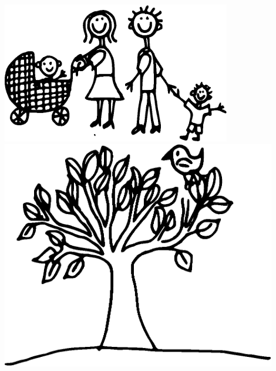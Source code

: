 \documentclass[11pt,a4paper,twoside]{article}
\begin{document}
\pagebreak
\includegraphics[width=10cm]{1.eps}
\vfil
\pagebreak
\vfil
\pagebreak
\vfil
\pagebreak
\vfil
\vfil
\vfil
\vfil
\hspace*{1cm}\includegraphics[width=12cm]{2.eps}
\vfil
\pagebreak
\vfil
\end{document}
